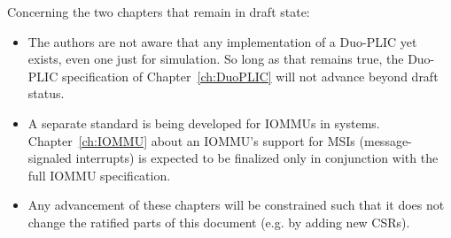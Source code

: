 Concerning the two chapters that remain in draft state:
\begin{itemize}

\item
The authors are not aware that any implementation of
a Duo-PLIC yet exists, even one just for simulation.
So long as that remains true, the Duo-PLIC specification of
Chapter~\ref{ch:DuoPLIC} will not advance beyond draft status.

\item
A separate standard is being developed for IOMMUs in {\RISCV} systems.
Chapter~\ref{ch:IOMMU} about an IOMMU's support for MSIs
(message-signaled interrupts) is expected to be finalized
only in conjunction with the full {\RISCV} IOMMU specification.

\item
Any advancement of these chapters will be constrained such that it does
not change the ratified parts of this document (e.g. by adding new CSRs).
\end{itemize}

